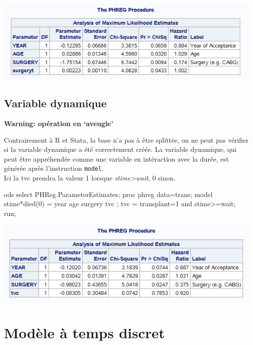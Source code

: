 \documentclass[
  12pt,
  letterpaper,
  DIV=11,
  numbers=noendperiod,
  onepage,
  openany]{scrreprt}
\newenvironment{Shaded}{\begin{snugshade}}{\end{snugshade}}
\newcommand{\DecValTok}[1]{\textcolor[rgb]{0.86,0.86,0.80}{#1}}
\newcommand{\FunctionTok}[1]{\textcolor[rgb]{0.94,0.94,0.56}{#1}}
\newcommand{\NormalTok}[1]{\textcolor[rgb]{0.80,0.80,0.80}{#1}}
\newcommand{\OtherTok}[1]{\textcolor[rgb]{0.94,0.94,0.56}{#1}}
\newcommand{\SpecialCharTok}[1]{\textcolor[rgb]{0.86,0.64,0.64}{#1}}
\begin{document}
\includegraphics{sas/5d.PNG}

\hypertarget{variable-dynamique}{%
\subsection{Variable dynamique}\label{variable-dynamique}}

\textbf{Warning: opération en `aveugle'}

Contrairement à R et Stata, la base n'a pas à être splittée, on ne peut
pas vérifier si la variable dynamique a été correctement créée. La
variable dynamique, qui peut être appréhendée comme une variable en
intéraction avec la durée, est générée après l'instruction
\texttt{model}.\\
Ici la tvc prendra la valeur 1 lorsque \emph{stime\textgreater wait}, 0
sinon.

\begin{Shaded}
\begin{Highlighting}[]
\NormalTok{ods select PHReg.ParameterEstimates;}
\NormalTok{proc phreg data}\OtherTok{=}\NormalTok{trans;}
\NormalTok{model stime}\SpecialCharTok{*}\FunctionTok{died}\NormalTok{(}\DecValTok{0}\NormalTok{) }\OtherTok{=}\NormalTok{ year age surgery tvc ;}
\NormalTok{tvc }\OtherTok{=}\NormalTok{ transplant}\OtherTok{=}\DecValTok{1}\NormalTok{ and stime}\SpecialCharTok{\textgreater{}=}\NormalTok{wait;}
\NormalTok{run;}
\end{Highlighting}
\end{Shaded}

\includegraphics{sas/6.PNG}

\hypertarget{moduxe8le-uxe0-temps-discret-2}{%
\section{Modèle à temps discret}\label{moduxe8le-uxe0-temps-discret-2}}
\end{document}
